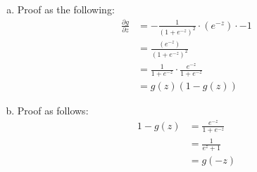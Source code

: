 \begin{enumerate}[(a)]
    \item Proof as the following:
    \begin{align*}
        \frac{\partial g}{\partial z} &= - \frac{1}{\left(1 + e^{-z}\right)^2 } \cdot \left(e^{-z}\right) \cdot -1 \\
        &= \frac{\left(e^{-z}\right)}{\left(1 + e^{-z}\right)^2} \\
        &= \frac{1}{1+e^{-z}} \cdot \frac{e^{-z}}{1+e^{-z}} \\
        &= g(z)(1-g(z))
    \end{align*}
    \item Proof as follows:
    \begin{align*}
        1 - g(z) &= \frac{e^{-z}}{1+e^{-z}} \\
        &= \frac{1}{e^z + 1} \\
        &= g(-z)
    \end{align*}
\end{enumerate}


